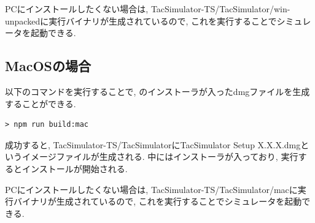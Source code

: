PCにインストールしたくない場合は, TacSimulator-TS/TacSimulator/win-unpackedに実行バイナリが生成されているので, これを実行することでシミュレータを起動できる.

\subsection{MacOSの場合}

以下のコマンドを実行することで, \tacsim のインストーラが入ったdmgファイルを生成することができる.

\begin{mylist}
\begin{verbatim}
> npm run build:mac
\end{verbatim}
\end{mylist}

成功すると, TacSimulator-TS/TacSimulatorにTacSimulator Setup X.X.X.dmgというイメージファイルが生成される. 中にはインストーラが入っており, 実行するとインストールが開始される.

PCにインストールしたくない場合は, TacSimulator-TS/TacSimulator/macに実行バイナリが生成されているので, これを実行することでシミュレータを起動できる.
